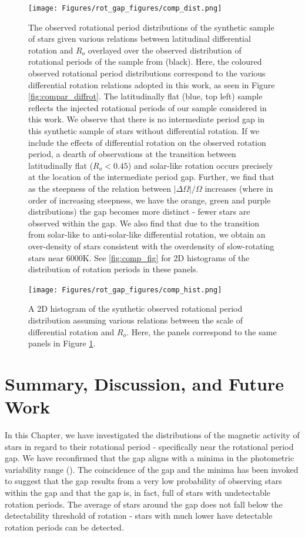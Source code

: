 \begin{figure}
\centering
  \texttt{[image: Figures/rot\_gap\_figures/comp\_dist.png]}
  \caption{
  	The observed rotational period distributions of the synthetic sample of stars given various relations between latitudinal differential rotation and $R_o$ overlayed over the observed distribution of rotational periods of the \kepler{} sample from \citet{mcquillan_rotation_2014} (black). Here, the coloured observed rotational period distributions correspond to the various differential rotation relations adopted in this work, as seen in Figure \ref{fig:compar_diffrot}. The latitudinally flat (blue, top left) sample reflects the injected rotational periods of our sample considered in this work. We observe that there is no intermediate period gap in this synthetic sample of stars without differential rotation. If we include the effects of differential rotation on the observed rotation period, a dearth of observations at the transition between latitudinally flat ($R_o<0.45$) and solar-like rotation occurs precisely at the location of the intermediate period gap. 
 Further, we find that as the steepness of the relation between $|\Delta \Omega| / \Omega$ increases (where in order of increasing steepness, we have the orange, green and purple distributions) the gap becomes more distinct - fewer stars are observed within the gap. We also find that due to the transition from solar-like to anti-solar-like differential rotation, we obtain an over-density of stars consistent with the overdensity of slow-rotating stars near 6000K. See \ref{fig:comp_fig} for 2D histograms of the distribution of rotation periods in these panels.}
  \label{fig:comp_dist}
\end{figure}

\begin{figure}
\centering
  \texttt{[image: Figures/rot\_gap\_figures/comp\_hist.png]}
  \caption{
  	A 2D histogram of the synthetic observed rotational period distribution assuming various relations between the scale of differential rotation and $R_o$. Here, the panels correspond to the same panels in Figure \ref{fig:comp_dist}.}
  \label{fig:comp_hist}
\end{figure}

\section{Summary, Discussion, and Future Work}
\label{sec:sum_dis}

In this Chapter, we have investigated the distributions of the magnetic activity of stars in regard to their rotational period - specifically near the rotational period gap.
We have reconfirmed that the gap aligns with a minima in the photometric variability range (\rper).
The coincidence of the gap and the minima has been invoked to suggest that the gap results from a very low probability of observing stars within the gap and that the gap is, in fact, full of stars with undetectable rotation periods.
The average \rper{} of stars around the gap does not fall below the detectability threshold of rotation - stars with much lower \rper{} have detectable rotation periods can be detected.

